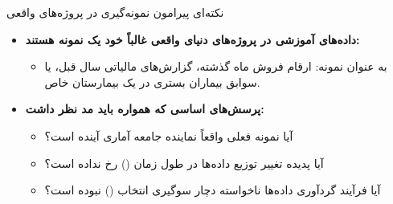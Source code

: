 \begin{frame}{نکته‌ای پیرامون نمونه‌گیری در پروژه‌های واقعی}
\begin{itemize}
  \item \textbf{داده‌های آموزشی در پروژه‌های دنیای واقعی غالباً خود یک نمونه هستند:}
  \begin{itemize}
    \item به عنوان نمونه: ارقام فروش ماه گذشته، گزارش‌های مالیاتی سال قبل، یا سوابق بیماران بستری در یک بیمارستان خاص.
  \end{itemize}
  \vspace{0.3cm}
  \item \textbf{پرسش‌های اساسی که همواره باید مد نظر داشت:}
  \begin{itemize}
    \item آیا نمونه فعلی واقعاً نماینده جامعه آماری آینده است؟
    \item آیا پدیده تغییر توزیع داده‌ها در طول زمان () رخ نداده است؟
    \item آیا فرآیند گردآوری داده‌ها ناخواسته دچار سوگیری انتخاب () نبوده است؟
  \end{itemize}
\end{itemize}
\end{frame}
